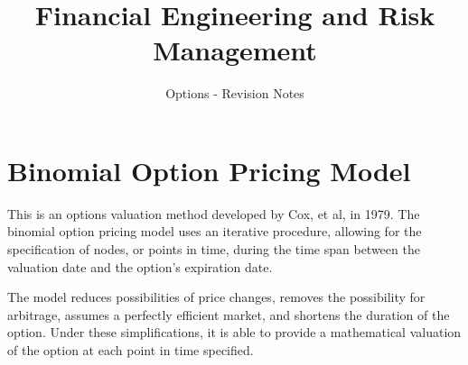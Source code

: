 \documentclass[11pt]{article} %
\title{Financial Engineering and Risk Management}
\author{Options - Revision Notes}
\begin{document}
\maketitle
\tableofcontents


\section{Binomial Option Pricing Model}

This is an options valuation method developed by Cox, et al, in 1979. The binomial option pricing model uses an iterative procedure, allowing for the specification of nodes, or points in time, during the time span between the valuation date and the option's expiration date. 
\newline

The model reduces possibilities of price changes, removes the possibility for arbitrage, assumes a perfectly efficient market, and shortens the duration of the option. Under these simplifications, it is able to provide a mathematical valuation of the option at each point in time specified.
\end{document}
